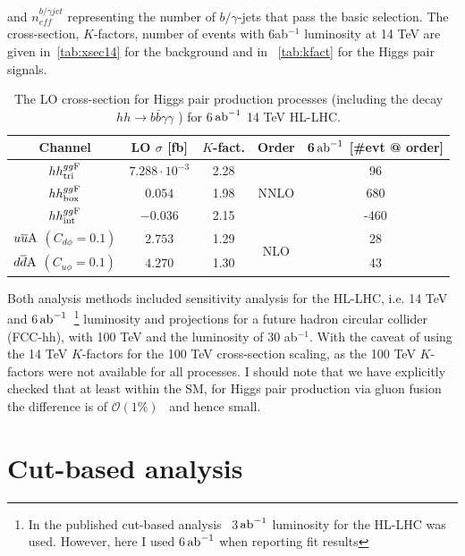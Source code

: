 and $n_{eff}^{b/\gamma jet}$ representing the number of $b/\gamma$-jets that pass the basic selection. The cross-section, $K$-factors, number of events with 6ab$^{-1}$ luminosity at 14 TeV are given in~\autoref{tab:xsec14} for the background and in~ \autoref{tab:kfact} for the Higgs pair signals. 
\begin{table}[t]
	\centering
	\begin{tabular}{ccccc}
		\toprule
		Channel	        &LO $\sigma $ [fb]	&$K$-fact.	&Order&6$\,{\rm ab}^{-1}$ [\#evt @ order]   \\
		\midrule
		$hh^{gg\rm F}_{\rm tri}$	        &  $7.288 \cdot10^{-3}$    & 2.28 &\multirow{3}{*}{NNLO}   &  96   \\ 
		$hh^{gg\rm F}_{\rm box}$            & $0.054$    & 1.98 &  & 680   \\ 
		$hh^{gg\rm F}_{\rm int}$            &$-0.036$    & 2.15 &  &-460   \\ 
		$u\overline u \rm A$ $(C_{d\phi}=0.1)$ &  $2.753$    & 1.29&\multirow{2}{*}{NLO} &  28   \\ 
		$d\overline d \rm A$ $(C_{u\phi}=0.1)$ &  $4.270$    & 1.30 & &  43   \\ 
		\bottomrule
	\end{tabular}
	\caption{  The LO cross-section for Higgs pair production processes (including the decay $hh \to b \bar b \gamma \gamma$ ) for 6$\,{\rm ab}^{-1}$ 14 TeV HL-LHC.}
	\label{tab:kfact}
\end{table}
Both analysis methods included sensitivity analysis for the HL-LHC, i.e. 14 TeV and 6$\,{\rm ab}^{-1}$~\footnote{In the published cut-based analysis~\cite{Alasfar:2019pmn} 3$\,{\rm ab}^{-1}$ luminosity for the HL-LHC was used. However, here I used 6$\,{\rm ab}^{-1}$ when reporting fit results} luminosity and projections for a future hadron circular collider (FCC-hh), with 100 TeV and the luminosity of 30 ab$^{-1}$. With the caveat of using the 14 TeV $K$-factors for the 100 TeV cross-section scaling, as the 100 TeV $K$-factors were not available for all processes. I should note that we have explicitly checked that at least within the SM, for Higgs pair production via gluon fusion the difference is of $\mathcal{O}(1\%)$~\cite{Maltoni:2014eza} and hence small.

\section{Cut-based analysis \label{sec:cutbasedly}}
